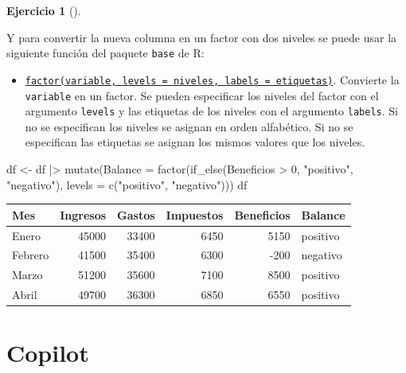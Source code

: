 \documentclass[
  a4paper,
]{scrreport}
\newenvironment{Shaded}{\begin{snugshade}}{\end{snugshade}}
\newcommand{\AttributeTok}[1]{\textcolor[rgb]{0.40,0.45,0.13}{#1}}
\newcommand{\DecValTok}[1]{\textcolor[rgb]{0.68,0.00,0.00}{#1}}
\newcommand{\FunctionTok}[1]{\textcolor[rgb]{0.28,0.35,0.67}{#1}}
\newcommand{\NormalTok}[1]{\textcolor[rgb]{0.00,0.23,0.31}{#1}}
\newcommand{\OtherTok}[1]{\textcolor[rgb]{0.00,0.23,0.31}{#1}}
\newcommand{\SpecialCharTok}[1]{\textcolor[rgb]{0.37,0.37,0.37}{#1}}
\newcommand{\StringTok}[1]{\textcolor[rgb]{0.13,0.47,0.30}{#1}}
\providecommand{\tightlist}{%
  \setlength{\itemsep}{0pt}\setlength{\parskip}{0pt}}\usepackage{longtable,booktabs,array}
\theoremstyle{definition}
\newtheorem{exercise}{Ejercicio}[chapter]
\theoremstyle{remark}
\begin{document}
\begin{exercise}[]
\begin{enumerate}
\begin{tcolorbox}
  Y para convertir la nueva columna en un factor con dos niveles se
  puede usar la siguiente función del paquete \texttt{base} de R:

  \begin{itemize}
  \tightlist
  \item
    \href{https://rdrr.io/r/base/factor.html}{\texttt{factor(variable,\ levels\ =\ niveles,\ labels\ =\ etiquetas)}}.
    Convierte la \texttt{variable} en un factor. Se pueden especificar
    los niveles del factor con el argumento \texttt{levels} y las
    etiquetas de los niveles con el argumento \texttt{labels}. Si no se
    especifican los niveles se asignan en orden alfabético. Si no se
    especifican las etiquetas se asignan los mismos valores que los
    niveles.
  \end{itemize}

\begin{Shaded}
\begin{Highlighting}[]
\NormalTok{df }\OtherTok{\textless{}{-}}\NormalTok{ df }\SpecialCharTok{|\textgreater{}}
    \FunctionTok{mutate}\NormalTok{(}\AttributeTok{Balance =} \FunctionTok{factor}\NormalTok{(}\FunctionTok{if\_else}\NormalTok{(Beneficios }\SpecialCharTok{\textgreater{}} \DecValTok{0}\NormalTok{, }\StringTok{"positivo"}\NormalTok{, }\StringTok{"negativo"}\NormalTok{),}
                 \AttributeTok{levels =} \FunctionTok{c}\NormalTok{(}\StringTok{"positivo"}\NormalTok{, }\StringTok{"negativo"}\NormalTok{)))}
\NormalTok{df}
\end{Highlighting}
\end{Shaded}

  \begin{longtable}[]{@{}lrrrrl@{}}
  \toprule\noalign{}
  Mes & Ingresos & Gastos & Impuestos & Beneficios & Balance \\
  \midrule\noalign{}
  \endhead
  \bottomrule\noalign{}
  \endlastfoot
  Enero & 45000 & 33400 & 6450 & 5150 & positivo \\
  Febrero & 41500 & 35400 & 6300 & -200 & negativo \\
  Marzo & 51200 & 35600 & 7100 & 8500 & positivo \\
  Abril & 49700 & 36300 & 6850 & 6550 & positivo \\
  \end{longtable}

  \section{Copilot}


\end{tcolorbox}
\end{enumerate}
\end{exercise}
\end{document}
